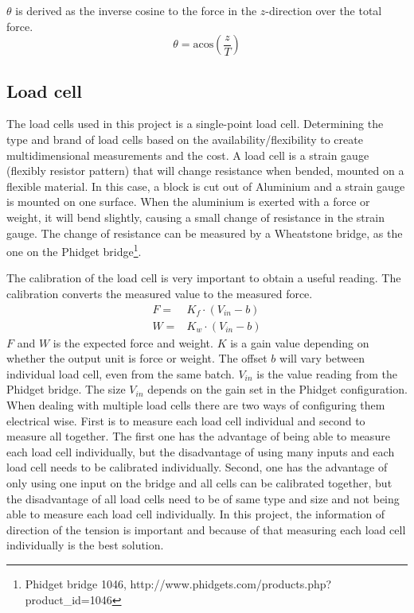 \noindent
$\theta$ is derived as the inverse cosine to the force in the $z$-direction over the total force.
\begin{equation}
\theta = \mathrm{acos}\left( \frac{z}{T} \right)
\end{equation}

\subsection{Load cell}
The load cells used in this project is a single-point load cell. Determining the type and brand of load cells based on the availability/flexibility to create multidimensional measurements and the cost. A load cell is a strain gauge (flexibly resistor pattern) that will change resistance when bended, mounted on a flexible material. In this case, a block is cut out of Aluminium and a strain gauge is mounted on one surface. When the aluminium is exerted with a force or weight, it will bend slightly, causing a small change of resistance in the strain gauge. The change of resistance can be measured by a Wheatstone bridge, as the one on the Phidget bridge\footnote{Phidget bridge 1046, http://www.phidgets.com/products.php?product\_id=1046}.

\noindent
The calibration of the load cell is very important to obtain a useful reading. The calibration converts the measured value to the measured force.  
\begin{eqnarray}
F =& K_f \cdot (V_{in} - b)\\
W =& K_w \cdot (V_{in} - b)
\end{eqnarray}
$F$ and $W$ is the expected force and weight. $K$ is a gain value depending on whether the output unit is force or weight. The offset $b$ will vary between individual load cell, even from the same batch. $V_{in}$ is the value reading from the Phidget bridge. The size $V_{in}$ depends on the gain set in the Phidget configuration.\\
\noindent
When dealing with multiple load cells there are two ways of configuring them electrical wise. First is to measure each load cell individual and second to measure all together. The first one has the advantage of being able to measure each load cell individually, but the disadvantage of using many inputs and each load cell needs to be calibrated individually. Second, one has the advantage of only using one input on the bridge and all cells can be calibrated together, but the disadvantage of all load cells need to be of same type and size and not being able to measure each load cell individually. In this project, the information of direction of the tension is important and because of that measuring each load cell individually is the best solution\cite{PhidgetsInc.2012}.

